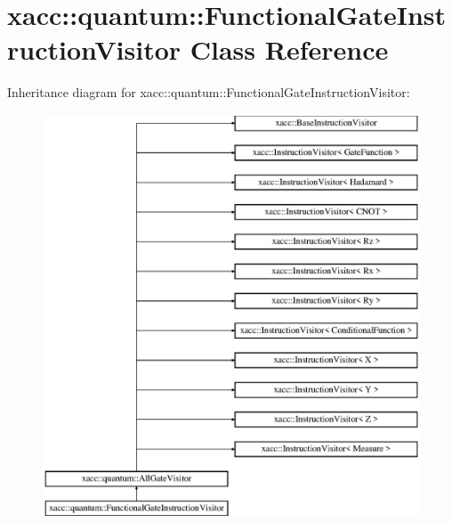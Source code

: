\hypertarget{a00031}{}\section{xacc\+:\+:quantum\+:\+:Functional\+Gate\+Instruction\+Visitor Class Reference}
\label{a00031}
Inheritance diagram for xacc\+:\+:quantum\+:\+:Functional\+Gate\+Instruction\+Visitor\+:\begin{figure}[H]
\begin{center}
\leavevmode
\includegraphics[height=12.000000cm]{a00031}
\end{center}
\end{figure}
